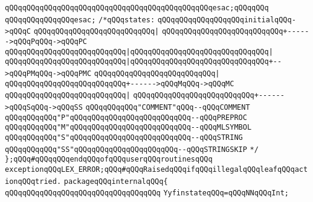 \verb|qQQqqQQqqQQqqQQqqQQqqQQqqQQqqQQqqQQqqQQqqQQqqQQqesac;qQQqqQQq|\newline
\newline
\verb|qQQqqQQqqQQqqQQqesac;|\newline
\newline
\verb|/*qQQqstates:|\newline
\newline
\verb|qQQqqQQqqQQqqQQqqQQqinitialqQQq->qQQqC|\newline
\verb|qQQqqQQqqQQqqQQqqQQqqQQqqQQq|\verb#|#\newline
\verb|qQQqqQQqqQQqqQQqqQQqqQQqqQQq+------>qQQqPqQQq->qQQqPC|\newline
\verb|qQQqqQQqqQQqqQQqqQQqqQQqqQQq|\verb#|qQQqqQQqqQQqqQQqqQQqqQQqqQQqqQQq|#\newline
\verb|qQQqqQQqqQQqqQQqqQQqqQQqqQQq|\verb#|qQQqqQQqqQQqqQQqqQQqqQQqqQQqqQQq+-->qQQqPMqQQq->qQQqPMC#\newline
\verb|qQQqqQQqqQQqqQQqqQQqqQQqqQQq|\verb#|#\newline
\verb|qQQqqQQqqQQqqQQqqQQqqQQqqQQq+------>qQQqMqQQq->qQQqMC|\newline
\verb|qQQqqQQqqQQqqQQqqQQqqQQqqQQq|\verb#|#\newline
\verb|qQQqqQQqqQQqqQQqqQQqqQQqqQQq+------>qQQqSqQQq->qQQqSS|\newline
\newline
\verb|qQQqqQQqqQQq"COMMENT"qQQq--qQQqCOMMENT|\newline
\verb|qQQqqQQqqQQq"P"qQQqqQQqqQQqqQQqqQQqqQQqqQQq--qQQqPREPROC|\newline
\verb|qQQqqQQqqQQq"M"qQQqqQQqqQQqqQQqqQQqqQQqqQQq--qQQqMLSYMBOL|\newline
\verb|qQQqqQQqqQQq"S"qQQqqQQqqQQqqQQqqQQqqQQqqQQq--qQQqSTRING|\newline
\verb|qQQqqQQqqQQq"SS"qQQqqQQqqQQqqQQqqQQqqQQq--qQQqSTRINGSKIP|\newline
\verb|*/|\newline
\newline
\verb|};qQQq#qQQqqQQqendqQQqofqQQquserqQQqroutinesqQQq|\newline
\verb|exceptionqQQqLEX_ERROR;qQQq#qQQqRaisedqQQqifqQQqillegalqQQqleafqQQqactionqQQqtried.|\newline
\verb|packageqQQqinternalqQQq{|\newline
\verb|qQQqqQQqqQQqqQQqqQQqqQQqqQQqqQQqqQQq|\newline
\newline
\verb|YyfinstateqQQq=qQQqNNqQQqInt;|\newline
